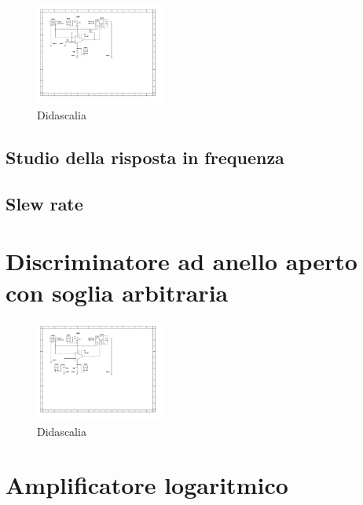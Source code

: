 \documentclass[journal]{IEEEtran}
\begin{document}
\begin{figure}[H]%
\begin {center}
\includegraphics[width=0.38\textwidth]{sch-simulations/output/OPA-closed-loop-non-inverting.pdf}
\caption{Didascalia}
\label{fig:oscilloscope}
\end {center}
\end{figure}

\subsection{Studio della risposta in frequenza}

\subsection{Slew rate}

\section{Discriminatore ad anello aperto con soglia arbitraria} %

\begin{figure}[H]%
\begin {center}
\includegraphics[width=0.38\textwidth]{sch-simulations/output/OPA-biased.pdf}
\caption{Didascalia}
\label{fig:oscilloscope}
\end {center}
\end{figure}


\section{Amplificatore logaritmico} %
\end{document}
